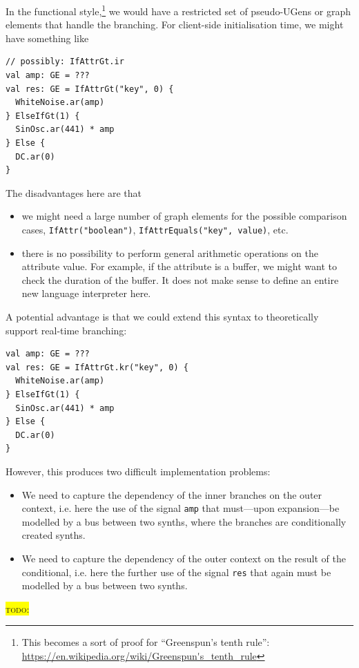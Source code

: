 \documentclass[11pt,a4paper]{article}
\newcommand{\todo}[1]{\colorbox{yellow}{\textsc{todo}: #1}}
\begin{document}
In the functional style,\footnote{This becomes a sort of proof for ``Greenspun's tenth rule'': \url{https://en.wikipedia.org/wiki/Greenspun's_tenth_rule}} we would have a restricted set of pseudo-UGens or graph elements that handle the branching. For client-side initialisation time, we might have something like
%
\begin{verbatim}
// possibly: IfAttrGt.ir
val amp: GE = ???
val res: GE = IfAttrGt("key", 0) {
  WhiteNoise.ar(amp)
} ElseIfGt(1) {
  SinOsc.ar(441) * amp
} Else {
  DC.ar(0)
}
\end{verbatim}
%
The disadvantages here are that
\begin{itemize}
\item we might need a large number of graph elements for the possible comparison cases, \verb!IfAttr("boolean")!, \verb!IfAttrEquals("key", value)!, etc.
\item there is no possibility to perform general arithmetic operations on the attribute value. For example, if the attribute is a buffer, we might want to check the duration of the buffer. It does not make sense to define an entire new language interpreter here.
\end{itemize}
%
A potential advantage is that we could extend this syntax to theoretically support real-time branching:
%
\begin{verbatim}
val amp: GE = ???
val res: GE = IfAttrGt.kr("key", 0) {
  WhiteNoise.ar(amp)
} ElseIfGt(1) {
  SinOsc.ar(441) * amp
} Else {
  DC.ar(0)
}
\end{verbatim}
%
However, this produces two difficult implementation problems:
%
\begin{itemize}
\item We need to capture the dependency of the inner branches on the outer context, i.e. here the use of the signal \verb!amp! that must---upon expansion---be modelled by a bus between two synths, where the branches are conditionally created synths.
\item We need to capture the dependency of the outer context on the result of the conditional, i.e. here the further use of the signal \verb!res! that again must be modelled by a bus between two synths.
\end{itemize}

\todo{}
\end{document}
